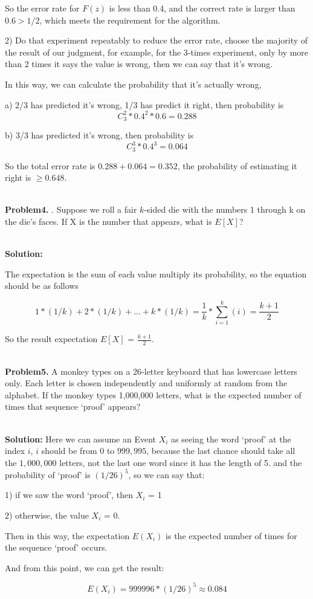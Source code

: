 \documentclass{article}
\begin{document}
So the error rate for $F(z)$ is less than 0.4, and the correct rate is larger than $0.6 > 1/2$, which meets the requirement for the algorithm.

2) Do that experiment repeatably to reduce the error rate, choose the majority of the result of our judgment, for example, for the 3-times experiment, only by more than 2 times it says the value is wrong, then we can say that it's wrong.

In this way, we can calculate the probability that it's actually wrong, 

a) 2/3 has predicted it's wrong, 1/3 has predict it right, then probability is 
$$C_3^2 * {0.4}^2 * 0.6 = 0.288$$

b) 3/3 has predicted it's wrong, then probability is
$$C_3^3 * {0.4}^3 = 0.064$$

So the total error rate is $0.288+0.064=0.352$, the probability of estimating it right is $\ge 0.648$.

~\\


\noindent \textbf{Problem4.} . Suppose we roll a fair $k$-sided die with the numbers 1 through k on the die's faces. If X is the number that appears, what is $E[X]$?

~\\

\noindent \textbf{Solution:}

The expectation is the sum of each value multiply its probability, so the equation should be as follows

$$ 1 * (1/k) + 2 * (1/k) + ... + k * (1/k) = \frac{1}{k} * \sum_{i=1}^{k}(i) = \frac{k+1}{2}$$

So the result expectation $E[X]$ = $\frac{k+1}{2}$.

~\\

\noindent \textbf{Problem5.} A monkey types on a 26-letter keyboard that has lowercase letters only. Each letter is chosen independently and uniformly at random from the alphabet. If the monkey types 1,000,000 letters, what is
the expected number of times that sequence `proof' appears?

~\\

\noindent \textbf{Solution:}
Here we can assume an Event $X_i$ as seeing the word `proof' at the index $i$, $i$ should be from 0 to $999,995$, because the last chance should take all the $1,000,000$ letters, not the last one word since it has the length of 5.
and the probability of `proof' is $(1/26)^5$, so we can say that:

1) if we saw the word `proof', then $X_i$ = 1

2) otherwise, the value $X_i$ = 0.

Then in this way, the expectation $E(X_i)$ is the expected number of times for the sequence `proof' occurs. 

And from this point, we can get the result:

$$E(X_i) = 999996 * (1/26)^5 \approx 0.084$$

~\\ %
\end{document}
